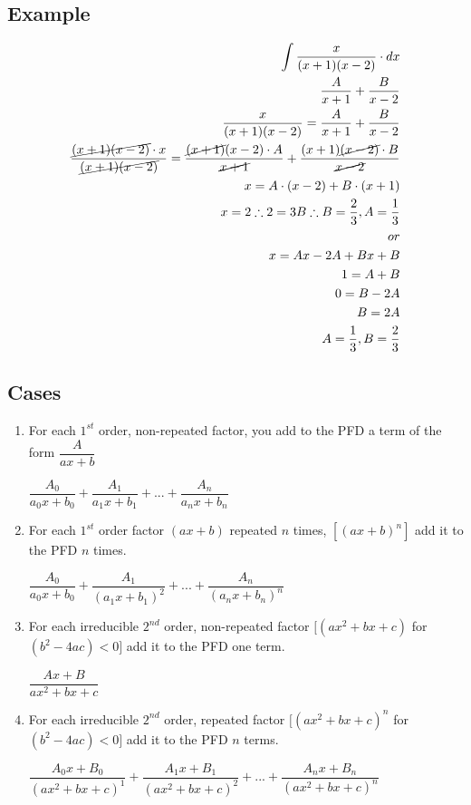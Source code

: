 \documentclass{article}
\begin{document}
\subsection*{Example}
\begin{equation}
\begin{aligned}
\int \dfrac{x}{(x+1)(x-2)} \cdot dx\\
\dfrac{A}{x+1}+\dfrac{B}{x-2}\\
\dfrac{x}{(x+1)(x-2)}=\dfrac{A}{x+1}+\dfrac{B}{x-2}\\
\dfrac{\cancel{(x+1)(x-2)} \cdot x}{\cancel{(x+1)(x-2)}}=\dfrac{\cancel{(x+1)}(x-2) \cdot A}{\cancel{x+1}}+\dfrac{(x+1)\cancel{(x-2)} \cdot B}{\cancel{x-2}}\\
x=A \cdot (x-2)+B \cdot (x+1)\\
x=2 \therefore 2=3B \therefore B=\dfrac{2}{3}, A=\dfrac{1}{3} \\
or\\
x=Ax-2A+Bx+B\\
1=A+B\\
0=B-2A\\
B=2A\\
A=\dfrac{1}{3}, B=\dfrac{2}{3}
\end{aligned}
\end{equation}
\subsection*{Cases}
\begin{enumerate}
\item For each $1^{st}$ order, non-repeated factor, you add to the PFD a term of the form $\dfrac{A}{ax+b}$\\
\begin{center}
$ \dfrac{A_0}{a_0x+b_0}+\dfrac{A_1}{a_1x+b_1}+...+\dfrac{A_n}{a_nx+b_n} $
\end{center}
\item For each $1^{st}$ order factor $(ax+b)$ repeated $n$ times, $[(ax+b)^n]$ add it to the PFD $n$ times.
\begin{center}
$ \dfrac{A_0}{a_0x+b_0}+\dfrac{A_1}{(a_1x+b_1)^2}+...+\dfrac{A_n}{(a_nx+b_n)^n} $
\end{center}
\item For each irreducible $2^{nd}$ order, non-repeated factor $[(ax^2+bx+c)$ for $(b^2-4ac)<0]$ add it to the PFD one term.
\begin{center}
$ \dfrac{Ax+B}{ax^2+bx+c} $
\end{center}
\item For each irreducible $2^{nd}$ order, repeated factor $[(ax^2+bx+c)^n$ for $(b^2-4ac)<0]$ add it to the PFD $n$ terms.
\begin{center}
$ \dfrac{A_0x+B_0}{(ax^2+bx+c)^1}+\dfrac{A_1x+B_1}{(ax^2+bx+c)^2}+...+\dfrac{A_nx+B_n}{(ax^2+bx+c)^n}$
\end{center}
\end{enumerate}
\end{document}
